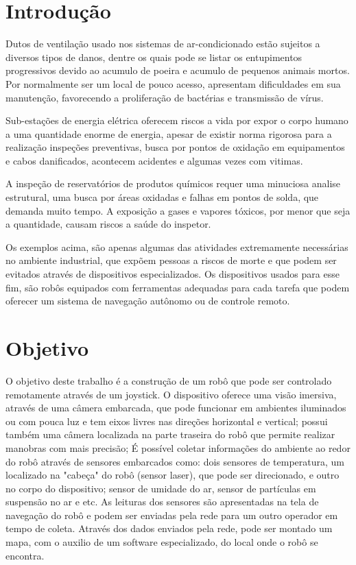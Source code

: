 \documentclass[12pt,a4paper]{article}
\begin{document}
\section{Introdução}
	Dutos de ventilação usado nos sistemas de ar-condicionado estão sujeitos a diversos tipos de danos, dentre os quais pode se listar os entupimentos progressivos devido ao acumulo de poeira e acumulo de pequenos animais mortos. Por normalmente ser um local de pouco acesso, apresentam dificuldades em sua manutenção, favorecendo a proliferação de bactérias e transmissão de vírus.\par
	Sub-estações de energia elétrica oferecem riscos a vida por expor o corpo humano a uma quantidade enorme de energia, apesar de existir norma rigorosa para a realização inspeções preventivas, busca por pontos de oxidação em equipamentos e cabos danificados, acontecem acidentes e algumas vezes com vitimas.\par
	A inspeção de reservatórios de produtos químicos requer uma minuciosa analise estrutural, uma busca por áreas oxidadas e falhas em pontos de solda,  que demanda muito tempo. A exposição a gases e vapores tóxicos, por menor que seja a quantidade, causam riscos a saúde do inspetor.\par
	Os exemplos acima, são apenas algumas das atividades extremamente necessárias no ambiente industrial, que expõem pessoas a riscos de morte e que podem ser evitados através de dispositivos especializados. Os dispositivos usados para esse fim, são robôs equipados com ferramentas adequadas para cada tarefa que podem oferecer um sistema de navegação autônomo ou de controle remoto.

\section{Objetivo}
	O objetivo deste trabalho é a construção de um robô que pode ser controlado remotamente através de um joystick. O dispositivo oferece uma visão imersiva, através de uma câmera embarcada, que pode funcionar em ambientes iluminados ou com pouca luz e tem eixos livres nas direções horizontal e vertical; possui também uma câmera localizada na parte traseira do robô que permite realizar manobras com mais precisão; É possível coletar informações do ambiente ao redor do robô através de sensores embarcados como: dois sensores de temperatura, um localizado na "cabeça" do robô (sensor laser), que pode ser direcionado, e outro no corpo do dispositivo; sensor de umidade do ar, sensor de partículas em suspensão no ar e etc. As leituras dos sensores são apresentadas na tela de navegação do robô e podem ser enviadas pela rede para um outro operador em tempo de coleta. Através dos dados enviados pela rede, pode ser montado um mapa, com o auxilio de um software especializado, do local onde o robô se encontra.
\end{document}

